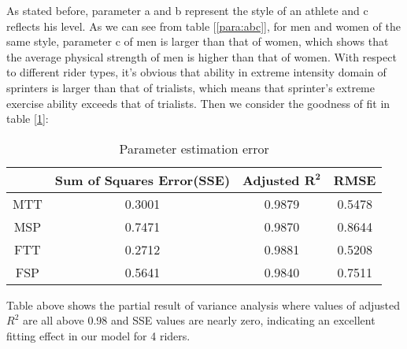 As stated before, parameter a and b represent the style of an athlete and c reflects his level. As we can see from table [\ref{para:abc}], for men and women of the same style, parameter c of men is larger than that of women, which shows that the average physical strength of men is higher than that of women. With respect to different rider types, it's obvious that ability in extreme intensity domain of sprinters is larger than that of trialists, which means that sprinter's extreme exercise ability exceeds that of trialists.
Then we consider the goodness of fit in table [\ref{tab:sse}]:
\begin{table}[h]
	\setlength{\belowcaptionskip}{0.2cm}
	\setlength\tabcolsep{16pt}%
	\centering
	\caption{Parameter estimation error}
\begin{tabular}{cccc}
\toprule[2pt]
& {\bf Sum of Squares Error(SSE) }  & {\bf Adjusted }$\bm{R^2}$ & {\bf RMSE} \\
\midrule
	MTT   & 0.3001  & 0.9879  & 0.5478  \\
	MSP   & 0.7471  & 0.9870  & 0.8644  \\
	FTT   & 0.2712  & 0.9881  & 0.5208  \\
	FSP   & 0.5641  & 0.9840  & 0.7511  \\
		\bottomrule[2pt]
\end{tabular}%

	\label{tab:sse}%
\end{table}%
\par Table above shows the partial result of variance analysis where values of adjusted $R^2$ are all above 0.98 and SSE values are nearly zero, indicating an excellent fitting effect in our model for 4 riders.